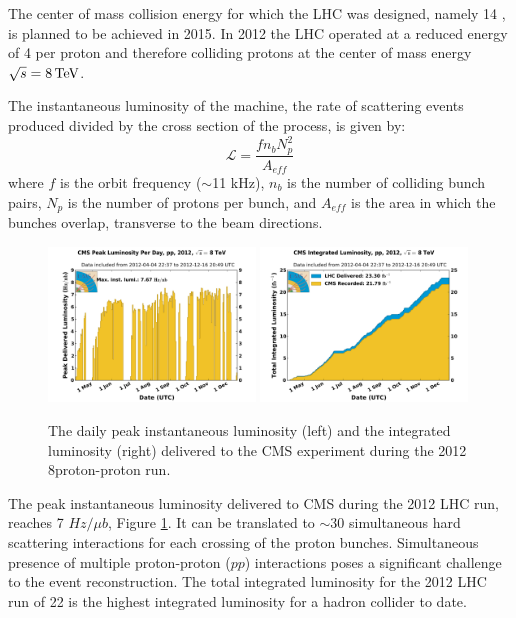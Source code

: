 The center of mass collision energy for which the LHC was designed, namely 14 \TeV,
 is planned to be achieved in 2015.
In 2012 the LHC operated at a reduced energy of 4 \TeV per proton
and therefore colliding protons at the
center of mass energy $\sqrt{s} = 8 \,\text{Te\hspace{-.08em}V}$.

The instantaneous luminosity of the machine, \ie the rate of scattering events produced divided
by the cross section of the process, is given by:
\begin{equation}
\mathcal{L}=\frac{f n_b N_p^2}{A_{eff}}
\end{equation}
where $f$ is the orbit frequency ($\sim$11 kHz), $n_b$ is the number of colliding bunch pairs, 
$N_p$ is the number of protons per bunch, and $A_{eff}$ is the area in which the bunches
overlap, transverse to the beam directions.


\begin{figure}[htbp]
\centering
\includegraphics[width=0.49\textwidth]{plots/intro/peak_lumi.pdf}
\includegraphics[width=0.49\textwidth]{plots/intro/int_lumi.pdf}
\caption{The daily peak instantaneous luminosity (left) and the integrated luminosity (right)
 delivered to the CMS experiment during the 2012 8\TeV proton-proton run.\label{fig:lumi}}
\end{figure}

The peak instantaneous luminosity delivered to CMS during the 2012 LHC run, 
 reaches 7 $Hz/\mu b$, Figure \ref{fig:lumi}. 
It can be translated to $\sim$30 simultaneous hard scattering interactions 
for each 
crossing of the proton bunches. Simultaneous presence of multiple proton-proton ($pp$) interactions
 poses a significant challenge to the event reconstruction. The total integrated luminosity 
for the 2012 LHC run of 22 \fbinv is the highest integrated luminosity for a hadron collider 
to date.
